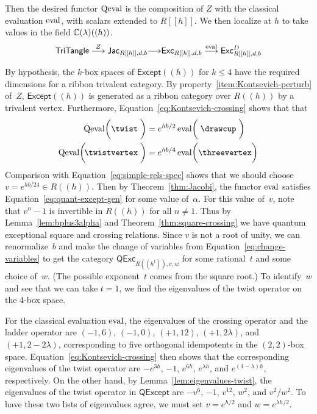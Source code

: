\documentclass[12pt]{amsart}
\begin{document}
Then the desired functor $\operatorname{Qeval}$ is the composition of $Z$ with the
classical evaluation $\operatorname{eval}$, with scalars extended to $R[[h]]$. We
then localize at $h$ to take values in the field
$\mathbb C(\lambda)((h))$.
\[
  \mathsf{TriTangle} \overset{Z}{\longrightarrow}
  \mathsf{Jac}_{R[[h]],d,b} {\longrightarrow}
  \mathsf{Exc}_{R[[h]],d,b} \overset{\operatorname{eval}}{\longrightarrow}
  \mathsf{Exc}^D_{R[[h]],d,b}
\]

By hypothesis, the $k$-box spaces of $\mathsf{Except}((h))$ for $k \le 4$
have the required dimensions for a ribbon trivalent category. By
property~\eqref{item:Kontsevich-perturb} of~$Z$,
$\mathsf{Except}((h))$
is generated as a ribbon category over $R((h))$ by a
trivalent vertex.
Furthermore, Equation~\eqref{eq:Kontsevich-crossing} shows that
 that
\begin{align*}
  \Qeval\biggl(\twist\;\biggr) &= e^{hb/2}\eval\biggl(\;\drawcup\;\biggr)\\
  \Qeval\biggl(\! \twistvertex\;\biggr) &= e^{hb/4}\eval\biggl(\threevertex\biggr)
\end{align*}
Comparison with Equation~\eqref{eq:simple-rels-spec} shows that we
should choose $v = e^{hb/24} \in R((h))$. Then by Theorem~\ref{thm:Jacobi}, the
functor $\operatorname{eval}$ satisfies Equation~\eqref{eq:quant-except-gen} for
some value of~$\alpha$. For this value of~$v$, note that $v^n - 1$ is
invertible in $R((h))$ for all $n \ne 1$. Thus by Lemma~\ref{lem:bplus3alpha} and
Theorem~\ref{thm:square-crossing} we have quantum exceptional square
and crossing relations. Since $v$ is not a root of unity, we can
renormalize~$b$ and make the
change of variables
from Equation~\eqref{eq:change-variables} to get the category
$\mathsf{QExc}_{R((h^t)),v,w}$ for some rational~$t$ and some choice
of~$w$. (The possible exponent~$t$ comes from the square root.) To
identify~$w$ and see that we can take $t=1$,
we find the eigenvalues
of the twist operator on the 4-box space.


For the classical evaluation $\operatorname{eval}$, the eigenvalues of the crossing
operator and the ladder operator
are $(-1, 6)$, $(-1, 0)$, $(+1, 12)$, $(+1, 2\lambda)$, and
$(+1, 2-2\lambda)$, corresponding to five orthogonal idempotents in the
$(2,2)$-box space. Equation~\eqref{eq:Kontsevich-crossing} then shows
that the corresponding eigenvalues of the twist operator are
$-e^{3h}$, $-1$, $e^{6h}$, $e^{\lambda h}$, and
$e^{(1-\lambda)h}$, respectively.
On the other hand, by Lemma~\ref{lem:eigenvalues-twist}, the
eigenvalues of the twist
operator in $\mathsf{QExcept}$ are $-v^6$, $-1$, $v^{12}$, $w^2$, and
$v^2/w^2$. To have these two lists of eigenvalues agree, we must
set $v = e^{h/2}$ and $w = e^{\lambda h/2}$.
\end{document}
